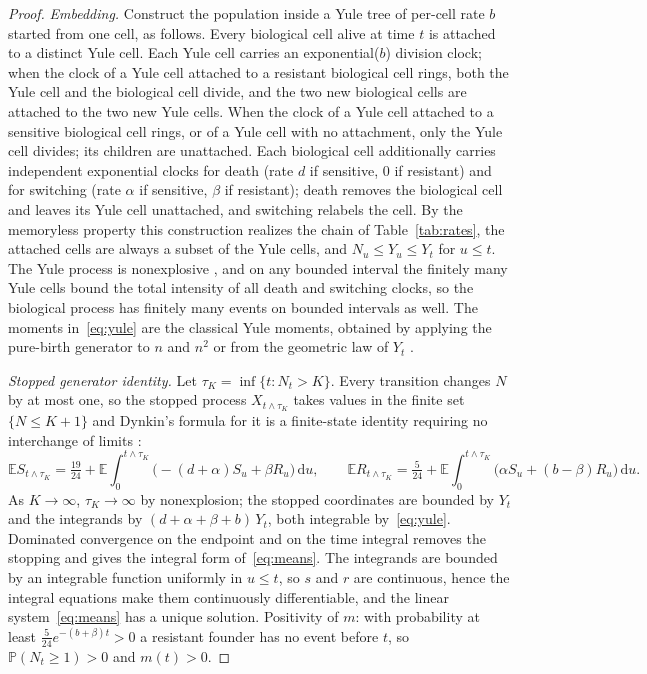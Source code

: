 \documentclass[11pt,a4paper]{article}
\theoremstyle{plain}
\theoremstyle{definition}
\theoremstyle{remark}
\newcommand{\PP}{\mathbb P}
\newcommand{\EE}{\mathbb E}
\newcommand{\dd}{\mathrm d}
\begin{document}
\begin{proof}
\emph{Embedding.} Construct the population inside a Yule tree of per-cell rate $b$ started from one cell, as follows. Every biological cell alive at time $t$ is attached to a distinct Yule cell. Each Yule cell carries an exponential($b$) division clock; when the clock of a Yule cell attached to a resistant biological cell rings, both the Yule cell and the biological cell divide, and the two new biological cells are attached to the two new Yule cells. When the clock of a Yule cell attached to a sensitive biological cell rings, or of a Yule cell with no attachment, only the Yule cell divides; its children are unattached. Each biological cell additionally carries independent exponential clocks for death (rate $d$ if sensitive, $0$ if resistant) and for switching (rate $\alpha$ if sensitive, $\beta$ if resistant); death removes the biological cell and leaves its Yule cell unattached, and switching relabels the cell. By the memoryless property this construction realizes the chain of Table~\ref{tab:rates}, the attached cells are always a subset of the Yule cells, and $N_u\le Y_u\le Y_t$ for $u\le t$. The Yule process is nonexplosive \citep[Chapter~2]{norris1997}, and on any bounded interval the finitely many Yule cells bound the total intensity of all death and switching clocks, so the biological process has finitely many events on bounded intervals as well. The moments in~\eqref{eq:yule} are the classical Yule moments, obtained by applying the pure-birth generator to $n$ and $n^2$ or from the geometric law of $Y_t$ \citep{yule1925,kendall1948}.

\emph{Stopped generator identity.} Let $\tau_K=\inf\{t:N_t>K\}$. Every transition changes $N$ by at most one, so the stopped process $X_{t\wedge\tau_K}$ takes values in the finite set $\{N\le K+1\}$ and Dynkin's formula for it is a finite-state identity requiring no interchange of limits \citep[Chapter~4]{ethierkurtz1986}:
\[
\EE S_{t\wedge\tau_K}=\tfrac{19}{24}+\EE\int_0^{t\wedge\tau_K}\bigl(-(d+\alpha)S_u+\beta R_u\bigr)\,\dd u,
\qquad
\EE R_{t\wedge\tau_K}=\tfrac5{24}+\EE\int_0^{t\wedge\tau_K}\bigl(\alpha S_u+(b-\beta)R_u\bigr)\,\dd u .
\]
As $K\to\infty$, $\tau_K\to\infty$ by nonexplosion; the stopped coordinates are bounded by $Y_t$ and the integrands by $(d+\alpha+\beta+b)\,Y_t$, both integrable by~\eqref{eq:yule}. Dominated convergence on the endpoint and on the time integral removes the stopping and gives the integral form of~\eqref{eq:means}. The integrands are bounded by an integrable function uniformly in $u\le t$, so $s$ and $r$ are continuous, hence the integral equations make them continuously differentiable, and the linear system~\eqref{eq:means} has a unique solution. Positivity of $m$: with probability at least $\frac5{24}e^{-(b+\beta)t}>0$ a resistant founder has no event before $t$, so $\PP(N_t\ge1)>0$ and $m(t)>0$.


\end{proof}
\end{document}
